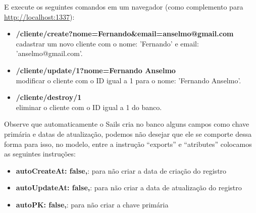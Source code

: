 \documentclass[a4paper,11pt]{article}
\begin{document}
E execute os seguintes comandos em um navegador (como complemento para \url{http://localhost:1337}):
\begin{itemize}
  \item \textbf{/cliente/create?nome=Fernando\&email=anselmo@gmail.com} \\
  cadastrar um novo cliente com o nome: 'Fernando' e email: 'anselmo@gmail.com'.
  \item \textbf{/cliente/update/1?nome=Fernando Anselmo} \\
  modificar o cliente com o ID igual a 1 para o nome: 'Fernando Anselmo'.
  \item \textbf{/cliente/destroy/1} \\
  eliminar o cliente com o ID igual a 1 do banco.
\end{itemize}
Observe que automaticamente o Sails cria no banco alguns campos como chave primária e datas de atualização, podemos não desejar que ele se comporte dessa forma para isso, no modelo, entre a instrução ``exports'' e ``atributes'' colocamos as seguintes instruções:
\begin{itemize}
  \item \textbf{autoCreateAt: false,}: para não criar a data de criação do registro
  \item \textbf{autoUpdateAt: false,}: para não criar a data de atualização do registro
  \item \textbf{autoPK: false,}: para não criar a chave primária  
\end{itemize}
\end{document}
